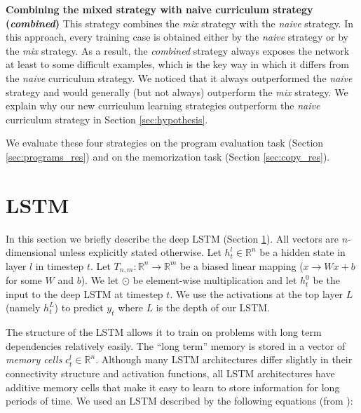 {\bf Combining the mixed strategy with naive curriculum strategy (\textit{combined})}
This strategy combines the \textit{mix} strategy with the \textit{naive} strategy.  In this approach, every training case is obtained either by the \textit{naive} strategy or by the \textit{mix} strategy. As a result, the \textit{combined} strategy always exposes the network at least to some difficult examples, which is the key way in which it differs from the \textit{naive} curriculum strategy. We noticed that it always outperformed the \textit{naive} strategy and would generally (but not always) outperform the \textit{mix} strategy. We explain why our new curriculum learning strategies outperform the \textit{naive} curriculum strategy in Section \ref{sec:hypothesis}.

We evaluate these four strategies on the program evaluation task (Section \ref{sec:programs_res}) and on the memorization task (Section \ref{sec:copy_res}).

\section{LSTM}

\label{sec:lstm}

In this section we briefly describe the deep LSTM (Section \ref{sec:lstm}).
All vectors are $n$-dimensional unless explicitly stated otherwise.  Let $h^l_t
\in \mathbb{R}^{n}$ be a hidden state in layer $l$ in timestep $t$. Let $T_{n,m}:\mathbb{R}^{n} \rightarrow \mathbb{R}^{m}$
be a biased linear mapping ($x\to Wx + b$ for some $W$ and $b$). We let $\odot$ be element-wise multiplication and let $h^0_t$ be the input to the deep LSTM at timestep $t$.  We use the activations at the top layer $L$ (namely $h^{L}_t$) to predict $y_t$ where $L$ is the depth of our LSTM. 

The structure of the LSTM allows it to train on problems with long term dependencies relatively easily.  The ``long term'' memory is stored in a vector of \emph{memory cells} $c^l_t \in \mathbb{R}^n$.  Although many LSTM architectures differ slightly in their connectivity structure and activation functions, all LSTM architectures have additive memory cells that make it easy to learn to store information for long periods of time. We used an LSTM described by the following equations (from \citet{graves2013speech}):

